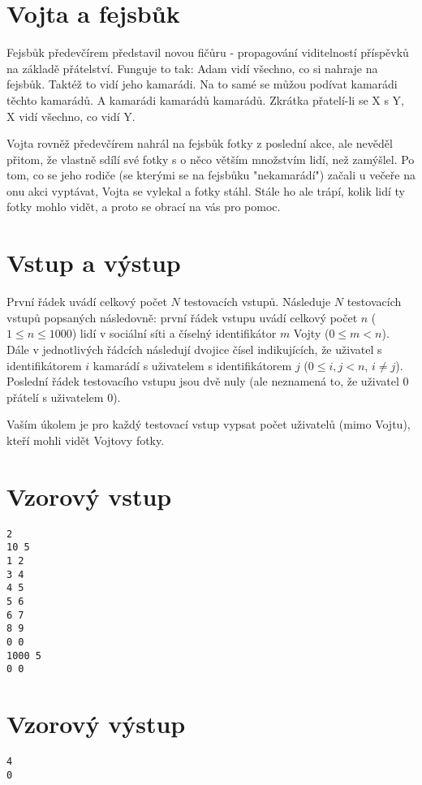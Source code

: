 \documentclass{article}
\begin{document}
\section*{\Huge Vojta a fejsbůk}
Fejsbůk předevčírem představil novou fičůru - propagování viditelností příspěvků na základě přátelství. Funguje to tak: Adam vidí všechno, co si nahraje na fejsbůk. Taktéž to vidí jeho kamarádi. Na to samé se můžou podívat kamarádi těchto kamarádů. A kamarádi kamarádů kamarádů. Zkrátka přatelí-li se X s Y, X vidí všechno, co vidí Y.

Vojta rovněž předevčírem nahrál na fejsbůk fotky z poslední akce, ale nevěděl přitom, že vlastně sdílí své fotky s o něco větším množstvím lidí, než zamýšlel. Po tom, co se jeho rodiče (se kterými se na fejsbůku "nekamarádí") začali u večeře na onu akci vyptávat, Vojta se vylekal a fotky stáhl. Stále ho ale trápí, kolik lidí ty fotky mohlo vidět, a proto se obrací na vás pro pomoc.

\section*{Vstup a výstup}
První řádek uvádí celkový počet $N$ testovacích vstupů. Následuje $N$ testovacích vstupů popsaných následovně: první řádek vstupu uvádí celkový počet $n$ ($1 \leq n \leq 1000$) lidí v sociální síti a číselný identifikátor $m$ Vojty ($0 \leq m < n$). Dále v jednotlivých řádcích následují dvojice čísel indikujících, že uživatel s identifikátorem $i$ kamarádí s uživatelem s identifikátorem $j$ ($0 \leq i, j < n$, $i \neq j$). Poslední řádek testovacího vstupu jsou dvě nuly (ale neznamená to, že uživatel 0 přátelí s uživatelem 0).

Vaším úkolem je pro každý testovací vstup vypsat počet uživatelů (mimo Vojtu), kteří mohli vidět Vojtovy fotky.

\section*{Vzorový vstup}
\begin{verbatim}
2
10 5
1 2
3 4
4 5
5 6
6 7
8 9
0 0
1000 5
0 0
\end{verbatim}

\section*{Vzorový výstup}
\begin{verbatim}
4
0
\end{verbatim}
\end{document}
